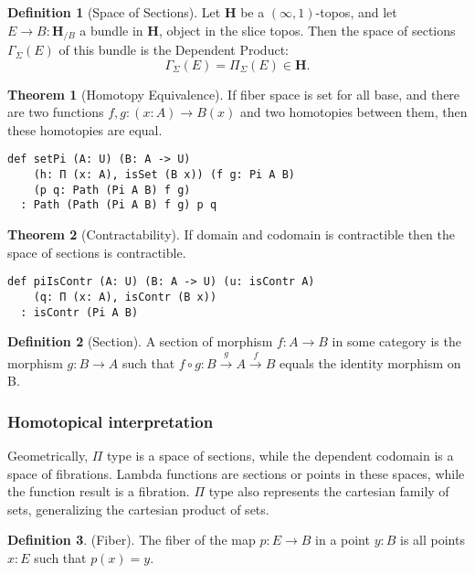 \documentclass{article}
\theoremstyle{definition}
\newtheorem{definition}{Definition}
\newtheorem{theorem}{Theorem}
\begin{document}
\begin{definition}[Space of Sections]
Let $\mathbf{H}$ be a $(\infty,1)$-topos, and let $E \rightarrow B : \mathbf{H}_{/B}$ a bundle in
$\mathbf{H}$, object in the slice topos. Then the space of sections $\Gamma_\Sigma(E)$
of this bundle is the Dependent Product:
$$ \Gamma_\Sigma(E) = \Pi_\Sigma (E) \in \mathbf{H}. $$
\end{definition}

\begin{theorem}[Homotopy Equivalence]
If fiber space is set for all base, and there are two functions
$f,g : (x:A) \rightarrow B(x)$ and two homotopies between them, then these homotopies are equal.
\begin{lstlisting}
def setPi (A: U) (B: A -> U)
    (h: П (x: A), isSet (B x)) (f g: Pi A B)
    (p q: Path (Pi A B) f g)
  : Path (Path (Pi A B) f g) p q
\end{lstlisting}
\end{theorem}

\begin{theorem}[Contractability]
If domain and codomain is contractible then the space of sections is contractible.
\begin{lstlisting}
def piIsContr (A: U) (B: A -> U) (u: isContr A)
    (q: П (x: A), isContr (B x))
  : isContr (Pi A B)
\end{lstlisting}
\end{theorem}

\begin{definition}[Section]
A section of morphism $f: A \rightarrow B$ in some category is the morphism $g: B \rightarrow A$
such that $f \circ g: B \xrightarrow{g} A \xrightarrow{f} B$ equals the identity morphism on B.
\end{definition}

\subsubsection*{Homotopical interpretation}

Geometrically, $\Pi$ type is a space of sections, while the dependent codomain is a space of fibrations.
Lambda functions are sections or points in these spaces, while the function result is a fibration.
$\Pi$ type also represents the cartesian family of sets, generalizing the cartesian product of sets.

\begin{definition} (Fiber).
The fiber of the map $p: E \rightarrow B$ in a point $y: B$ is all points $x: E$ such that $p(x)=y$.
\end{definition}
\end{document}
